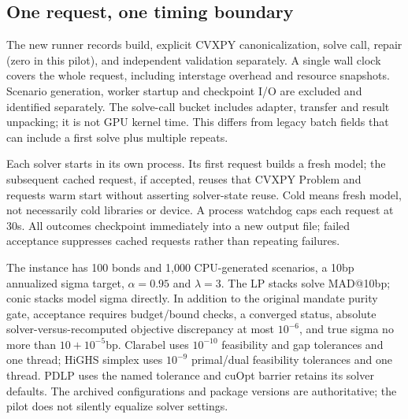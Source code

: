\documentclass[11pt,a4paper]{article}
\begin{document}
\subsection{One request, one timing boundary}\label{app:request}

The new runner records build, explicit CVXPY canonicalization, solve call,
repair (zero in this pilot), and independent validation separately. A single
wall clock covers the whole request, including interstage overhead and
resource snapshots. Scenario generation, worker startup and checkpoint I/O
are excluded and identified separately. The solve-call bucket includes adapter,
transfer and result unpacking; it is not GPU kernel time. This differs from
legacy batch fields that can include a first solve plus multiple repeats.

Each solver starts in its own process. Its first request builds a fresh model;
the subsequent cached request, if accepted, reuses that CVXPY Problem and
requests warm start without asserting solver-state reuse. Cold means fresh
model, not necessarily cold libraries or device. A process watchdog caps each
request at 30s. All outcomes checkpoint immediately into a new output file;
failed acceptance suppresses cached requests rather than repeating failures.

The instance has 100 bonds and 1,000 CPU-generated scenarios, a 10bp annualized
sigma target, $\alpha=0.95$ and $\lambda=3$. The LP stacks solve MAD@10bp;
conic stacks model sigma directly. In addition to the original mandate purity
gate, acceptance requires budget/bound checks, a converged status, absolute
solver-versus-recomputed objective discrepancy at most $10^{-6}$, and true
sigma no more than $10+10^{-5}$bp. Clarabel uses $10^{-10}$ feasibility and gap
tolerances and one thread; HiGHS simplex uses $10^{-9}$ primal/dual feasibility
tolerances and one thread. PDLP uses the named tolerance and cuOpt barrier
retains its solver defaults. The archived configurations and package versions
are authoritative; the pilot does not silently equalize solver settings.
\end{document}

